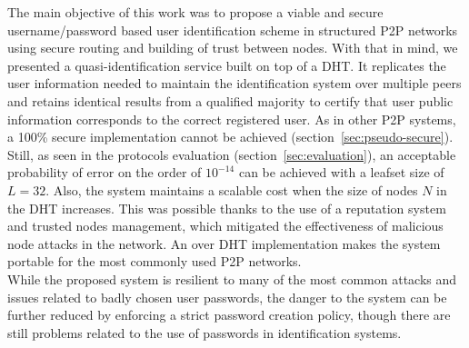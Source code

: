 The main objective of this work was to propose a viable and secure
username/password based user identification scheme in structured P2P
networks using secure routing and building of trust between nodes.
With that in mind, we presented a quasi-identification service built on top of a DHT. It
replicates the user information needed to maintain the identification system
over multiple peers and retains identical results from a qualified majority to
certify that user public information corresponds to the correct registered user.
As in other P2P
systems, a 100\% secure implementation cannot be achieved
(section~\ref{sec:pseudo-secure}). Still, as seen in the
protocols evaluation (section~\ref{sec:evaluation}), an acceptable probability of error on the order
of $10^{-14}$ can be achieved with a leafset size of $L = 32$. Also, the system
maintains a scalable cost when the size of nodes $N$ in the DHT increases.
This was possible thanks to the use of a reputation system and trusted
nodes management, which mitigated the effectiveness of malicious node attacks in
the network.
An over DHT implementation makes the system portable for the most commonly used P2P networks.\\


While the proposed system is resilient to many of the most common attacks
and issues related to badly chosen user passwords, the danger to the system can
be further reduced by enforcing a strict password creation policy, though there are still problems related to the use of
passwords in identification systems.

